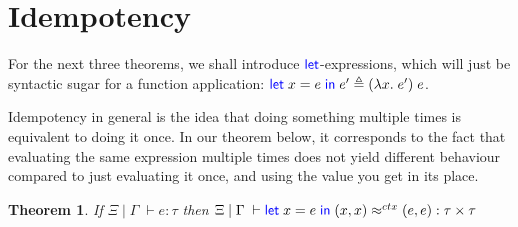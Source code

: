 \documentclass[a4paper, 11pt]{report}
\newtheorem{theorem}{Theorem}
\theoremstyle{definition}
\newcommand{\Keyword}[1]{{\color{blue} \mathsf{#1}}}
\newcommand{\var}{x}
\newcommand{\expr}{e}
\newcommand{\LetCmd}{\Keyword{let}}
\newcommand{\Tprod}[2]{#1 \times #2}
\newcommand{\typ}{\tau}
\newcommand{\venv}{\Gamma}
\newcommand{\tenv}{\Xi}
\newcommand{\jdg}[4]{#1 \; | \; #2 \; \vdash #3 : #4}
\newcommand{\jdgRel}[6]{#1 \; | \; #2 \; \vdash #3 \approx^{#4} #5 : #6}
\newcommand{\ctxRel}[5]{\jdgRel{#1}{#2}{#3}{ctx}{#4}{#5}}
\begin{document}
\section{Idempotency}
For the next three theorems, we shall introduce $\LetCmd$-expressions, which will just be syntactic sugar for a function application: $\Let \var = \expr in \expr' \triangleq (\fun \var . \expr') \; \expr$.

Idempotency in general is the idea that doing something multiple times is equivalent to doing it once. In our theorem below, it corresponds to the fact that evaluating the same expression multiple times does not yield different behaviour compared to just evaluating it once, and using the value you get in its place.
\begin{theorem}
  If $\jdg{\tenv}{\venv}{\expr}{\typ}$ then $\ctxRel{\tenv}{\venv}{\Let \var = \expr in (\var, \var)}{(\expr, \expr)}{\Tprod{\typ}{\typ}}$
\end{theorem}
\end{document}
